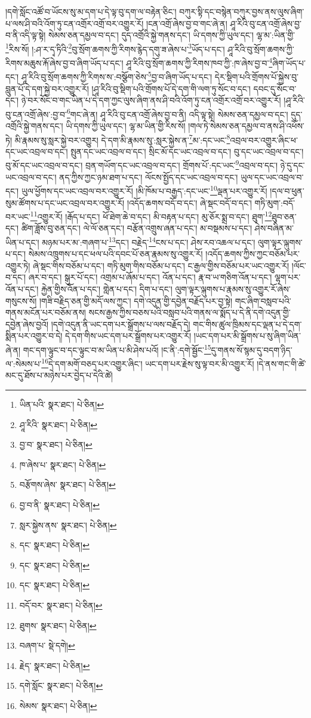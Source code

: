 །དགེ་སློང་འཚོ་བ་ཡོངས་སུ་མ་དག་པ་དེ་ལྟ་བུ་དག་ལ་བརྟེན་ཅིང་། བཀུར་སྟི་དང་བསྙེན་བཀུར་བྱས་ནས་ལུས་ཞིག་པ་ལས་ཤི་བའི་འོག་ཏུ་ངན་འགྲོར་འགྲོ་བར་འགྱུར་རོ། །ངན་འགྲོ་ཞེས་བྱ་བ་གང་ཞེ་ན། ཤཱ་རིའི་བུ་ངན་འགྲོ་ཞེས་བྱ་བ་ནི་འདི་ལྟ་སྟེ། སེམས་ཅན་དམྱལ་བ་དང་། དུད་འགྲོའི་སྐྱེ་གནས་དང་། ཡི་དགས་ཀྱི་ཡུལ་དང་། ལྷ་མ་:ཡིན་གྱི་\footnote{ཡིན་པའི་  སྣར་ཐང་།  པེ་ཅིན། }རིས་སོ། །:ཤ་ར་དྭ་ཏིའི་\footnote{ཤཱ་རིའི་  སྣར་ཐང་།  པེ་ཅིན། }བུ་སྲོག་ཆགས་ཀྱི་རིགས་རྙེད་དགུ་ཟ་ཞེས་པ་\footnote{བྱ་བ་  སྣར་ཐང་།  པེ་ཅིན། }ཡོད་པ་དང་། ཤཱ་རིའི་བུ་སྲོག་ཆགས་ཀྱི་རིགས་མཆུས་རྐོ་ཞེས་བྱ་བ་ཞིག་ཡོད་པ་དང་། ཤཱ་རིའི་བུ་སྲོག་ཆགས་ཀྱི་རིགས་ཁབ་ཀྱི་:ཁ་ཞེས་བྱ་བ་\footnote{ཁ་ཞེས་པ་  སྣར་ཐང་།  པེ་ཅིན། }ཞིག་ཡོད་པ་དང་། ཤཱ་རིའི་བུ་སྲོག་ཆགས་ཀྱི་རིགས་ས་:བསྩོག་ཅེས་\footnote{བརྩོགས་ཞེས་  སྣར་ཐང་།  པེ་ཅིན། }བྱ་བ་ཞིག་ཡོད་པ་དང་། དེར་སྡིག་པའི་གྲོགས་པོ་སྐྱེས་བུ་བླུན་པོ་དེ་དག་སྐྱེ་བར་འགྱུར་རོ། །ཤཱ་རིའི་བུ་སྡིག་པའི་གྲོགས་པོ་དེ་དག་གི་ལག་ཏུ་སོང་བ་དང་། དབང་དུ་སོང་བ་དང་། ཉེ་བར་སོང་བ་གང་ཡིན་པ་དེ་དག་ཀྱང་ལུས་ཞིག་ནས་ཤི་བའི་འོག་ཏུ་ངན་འགྲོར་འགྲོ་བར་འགྱུར་རོ། །ཤཱ་རིའི་བུ་ངན་འགྲོ་ཞེས་:བྱ་བ་\footnote{བྱ་བ་ནི་  སྣར་ཐང་།  པེ་ཅིན། }གང་ཞེ་ན། ཤཱ་རིའི་བུ་ངན་འགྲོ་ཞེས་བྱ་བ་ནི། འདི་ལྟ་སྟེ། སེམས་ཅན་དམྱལ་བ་དང་། དུད་འགྲོའི་སྐྱེ་གནས་དང་། ཡི་དགས་ཀྱི་ཡུལ་དང་། ལྷ་མ་ཡིན་གྱི་རིས་སོ། །གལ་ཏེ་སེམས་ཅན་དམྱལ་བ་ནས་ཤི་འཕོས་ཏེ། མི་རྣམས་སུ་སླར་སྐྱེ་བར་འགྱུར། དེ་དག་མི་རྣམས་སུ་:སླར་སྐྱེས་ན་\footnote{སླར་སྐྱེས་ནས་  སྣར་ཐང་།  པེ་ཅིན། }མ་:དང་ཡང་\footnote{དང་  སྣར་ཐང་།  པེ་ཅིན། }འབྲལ་བར་འགྱུར་ཞིང་ཕ་དང་ཡང་འབྲལ་བ་དང་། སྤུན་དང་ཡང་འབྲལ་བ་དང་། སྲིང་མོ་དང་ཡང་འབྲལ་བ་དང་། བུ་དང་ཡང་འབྲལ་བ་དང་། བུ་མོ་དང་ཡང་འབྲལ་བ་དང་། བྲན་གཡོག་དང་ཡང་འབྲལ་བ་དང་། གྲོགས་པོ་:དང་ཡང་\footnote{དང་  སྣར་ཐང་།  པེ་ཅིན། }འབྲལ་བ་དང་། ཉེ་དུ་དང་ཡང་འབྲལ་བ་དང་། ནད་ཀྱིས་ཀྱང་ཉམ་ཐག་པ་དང་། ལོངས་སྤྱོད་དང་ཡང་འབྲལ་བ་དང་། ཡུལ་དང་ཡང་འབྲལ་བ་དང་། ཡུལ་ཕྱོགས་དང་ཡང་འབྲལ་བར་འགྱུར་རོ། །མི་ཁོམ་པ་བརྒྱད་:དང་ཡང་\footnote{དང་  སྣར་ཐང་།  པེ་ཅིན། }ལྡན་པར་འགྱུར་རོ། །དལ་བ་ཕུན་སུམ་ཚོགས་པ་དང་ཡང་འབྲལ་བར་འགྱུར་རོ། །འདོད་ཆགས་བདོ་བ་དང་། ཞེ་སྡང་བདོ་བ་དང་། གཏི་མུག་:བདོ་བར་ཡང་\footnote{བདོ་བར་  སྣར་ཐང་།  པེ་ཅིན། }འགྱུར་རོ། །རྒོད་པ་དང་། ཕོ་ཐེག་ཆེ་བ་དང་། མི་བརྟན་པ་དང་། མུ་ཅོར་སྨྲ་བ་དང་། ཐུག་\footnote{ཐུགས་  སྣར་ཐང་།  པེ་ཅིན། }ཐུབ་ཅན་དང་། ཚིག་ཟློས་བུ་ཅན་དང་། ལེ་ལོ་ཅན་དང་། བརྩོན་འགྲུས་ཞན་པ་དང་། མ་བསྡམས་པ་དང་། ཤེས་བཞིན་མ་ཡིན་པ་དང་། མཉམ་པར་མ་:གཞག་པ་\footnote{བཞག་པ་  སྡེ་དགེ། }དང་། བརྗེད་\footnote{རྗེད་  སྣར་ཐང་།  པེ་ཅིན། }ངས་པ་དང་། ཤེས་རབ་འཆལ་པ་དང་། ལུག་ལྟར་ལྐུགས་པ་དང་། སེམས་འཁྲུགས་པ་དང་ཕལ་པའི་དབང་པོ་ཅན་རྣམས་སུ་འགྱུར་རོ། །འདོད་ཆགས་ཀྱིས་ཀྱང་བཅོམ་པར་འགྱུར་ཏེ། ཞེ་སྡང་གིས་བཅོམ་པ་དང་། གཏི་མུག་གིས་བཅོམ་པ་དང་། ང་རྒྱལ་གྱིས་བཅོམ་པར་ཡང་འགྱུར་རོ། །ལོང་བ་དང་། ཞར་བ་དང་། སྒུར་པོ་དང་། འགྲམ་པ་ཞོམ་པ་དང་། འོན་པ་དང་། རྣ་བ་ཡ་གཅིག་འོན་པ་དང་། ལྷག་པར་འོན་པ་དང་། རྐྱེན་གྱིས་འོན་པ་དང་། གླེན་པ་དང་། དིག་པ་དང་། ལུག་ལྟར་ལྐུགས་པ་རྣམས་སུ་འགྱུར་རོ་ཞེས་གསུངས་སོ། །གཟི་བརྗིད་ཅན་གྱི་མདོ་ལས་ཀྱང་། དགེ་འདུན་གྱི་དབྱེན་བརྗོད་པར་བྱ་སྟེ། གང་ཞིག་བསླབ་པའི་གནས་མངོན་པར་བཅོམ་ནས། སངས་རྒྱས་ཀྱིས་བཅས་པའི་བསླབ་པའི་གནས་ལ་སྨོད་པ་དེ་ནི་དགེ་འདུན་གྱི་དབྱེན་ཞེས་བྱའོ། །དགེ་འདུན་ནི་ཡང་དག་པར་སྒྲོགས་པ་ལས་བརྗོད་དེ། གང་གིས་ཚུལ་ཁྲིམས་དང་ལྡན་པ་དེ་དག་སྨིན་པར་འགྱུར་བ་དེ། དེ་དག་གིས་ཡང་དག་པར་སྒྲོགས་པར་འགྱུར་རོ། །ཡང་དག་པར་མི་སྒྲོགས་པ་སུ་ཞིག་ཡིན་ཞེ་ན། གང་དག་ལྟུང་བ་དང་ལྟུང་བ་མ་ཡིན་པ་མི་ཤེས་པའོ། །ང་ནི་:དགེ་སྦྱོང་\footnote{དགེ་སློང་  སྣར་ཐང་།  པེ་ཅིན། }དུ་གནས་སོ་སྙམ་དུ་བདག་ཉིད་ལ་:སེམས་པ་\footnote{སེམས་  སྣར་ཐང་།  པེ་ཅིན། }དེ་དག་མགོ་བཅད་པར་འགྱུར་ཞིང་། ཡང་དག་པར་རྗེས་སུ་ལྟ་བར་མི་འགྱུར་རོ། །དེ་ནས་གང་གི་ཚེ་མང་དུ་ཐོས་པ་མཉེས་པར་བྱེད་པ་དེའི་ཚེ། 